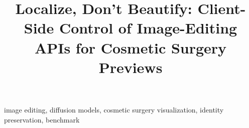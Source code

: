\documentclass[conference]{IEEEtran}
\begin{document}
\title{Localize, Don't Beautify: Client-Side Control of Image-Editing APIs for Cosmetic Surgery Previews}

\author{
}

\maketitle

\begin{abstract}

\end{abstract}

\begin{IEEEkeywords}
image editing, diffusion models, cosmetic surgery visualization, identity preservation, benchmark
\end{IEEEkeywords}













\end{document}
